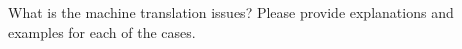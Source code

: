 What is the machine translation issues? Please provide explanations and examples for each of the cases.
